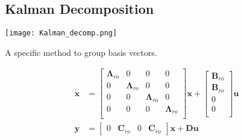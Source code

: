 \subsection{Kalman Decomposition}
\begin{center}
    \texttt{[image: Kalman\_decomp.png]}
\end{center}
A specific method to group basis vectors.

\newpar{}
\begin{align*}
    \dot{\mathbf{x}} & = \begin{bmatrix}
                             \bm{\Lambda}_{r\bar{o}} & 0                 & 0                             & 0                       \\
                             0                       & \bm{\Lambda}_{ro} & 0                             & 0                       \\
                             0                       & 0                 & \bm{\Lambda}_{\bar{r}\bar{o}} & 0                       \\
                             0                       & 0                 & 0                             & \bm{\Lambda}_{\bar{r}o} \\
                         \end{bmatrix}
    \mathbf{x} + \begin{bmatrix}
                     \mathbf{B}_{r\bar{o}} \\
                     \mathbf{B}_{ro}       \\
                     0                     \\
                     0                     \\
                 \end{bmatrix}
    \mathbf{u}                                                                                                                 \\
    \mathbf{y}       & = \begin{bmatrix}
                             0 & \mathbf{C}_{ro} & 0 & \mathbf{C}_{\bar{r}o}
                         \end{bmatrix}\mathbf{x}
    + \mathbf{Du}
\end{align*}

